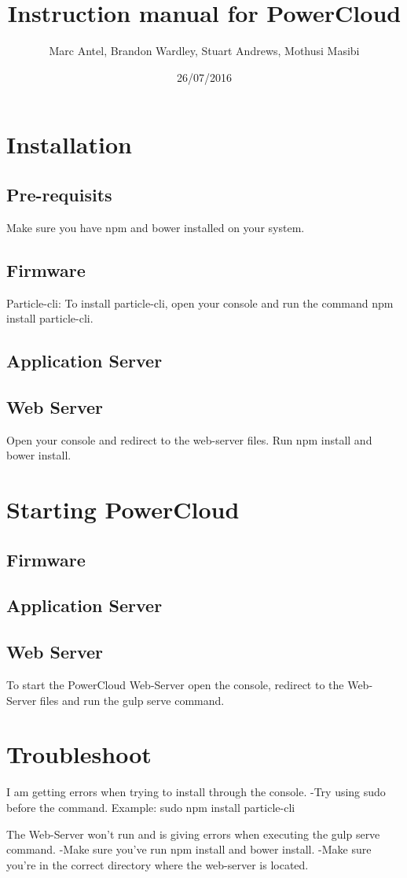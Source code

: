 \documentclass[a4paper,10pt]{article}
\title{Instruction manual for PowerCloud}
\author{Marc Antel, Brandon Wardley, Stuart Andrews, Mothusi Masibi}
\date{26/07/2016}
\begin{document}
\maketitle
\newpage
\section{Installation}
\subsection{Pre-requisits}
Make sure you have npm and bower installed on your system.
\subsection{Firmware}
Particle-cli:
To install particle-cli, open your console and run the command npm install particle-cli. 
\subsection{Application Server}
\subsection{Web Server}
Open your console and redirect to the web-server files. Run npm install and bower install.
\section{Starting PowerCloud}
\subsection{Firmware}
\subsection{Application Server}
\subsection{Web Server}
To start the PowerCloud Web-Server open the console, redirect to the Web-Server files and run the gulp serve command.
\section{Troubleshoot}
I am getting errors when trying to install through the console.
-Try using sudo before the command. Example: sudo npm install particle-cli

The Web-Server won't run and is giving errors when executing the gulp serve command.
-Make sure you've run npm install and bower install. 
-Make sure you're in the correct directory where the web-server is located.
\end{document}
